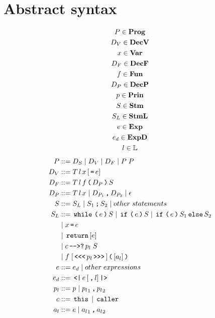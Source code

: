 \section{Abstract syntax}

\begin{gather*}
  P   \in \mathbf{Prog}\\
  D_V \in \mathbf{DecV}\\
  x   \in \mathbf{Var}\\
  D_F \in \mathbf{DecF} \\
  f   \in \mathbf{Fun}\\
  D_P \in \mathbf{DecP}\\
  p   \in \mathbf{Prin}\\
  S   \in \mathbf{Stm}\\
  S_L \in \mathbf{StmL}\\
  e   \in \mathbf{Exp}\\
  e_d \in \mathbf{ExpD}\\
  l   \in \mathbb{L}\\
\end{gather*}
\begin{align*}
  P       & ::= D_S \gp D_V \gp D_F \gp P \; P \\
  D_V     & ::= T \, l \, x \, [\tk = e] \\
  D_F     & ::= T \, l \, f \tk ( D_P \tk ) S \\
  D_P     & ::= T \, l \, x \gp D_{P_1} \tk , D_{P_2} \gp \epsilon \\
  S       & ::= S_L \gp S_1 \tk ; S_2 \gp other \; statements \\
  S_L     & ::= \tk{while} \tk ( e \tk ) S \gp \tk{if} \tk ( e \tk ) S \gp \tk{if} \tk ( e \tk ) S_1 \tk{else} S_2 \\
          & \gp x \tk = e \\
          & \gp \tk{return} [e] \\
          & \gp c \tk{-{}->?} p_l \; S \\
          & \gp f \; [\tk{<{}<{}<} p_l \tk{>{}>{}>}] \tk ( [a_l] \tk ) \\
  e       & ::= e_d \gp other \; expressions \\
  e_d     & ::= \tk{<|} e \, [\tk , l] \tk{|>} \\
  p_l     & ::= p \gp {p_l}_1 \tk , {p_l}_2 \\
  c       & ::= \tk{this} \gp \tk{caller} \\
  a_l     & ::= e \gp {a_l}_1 \tk , {a_l}_2
\end{align*}
